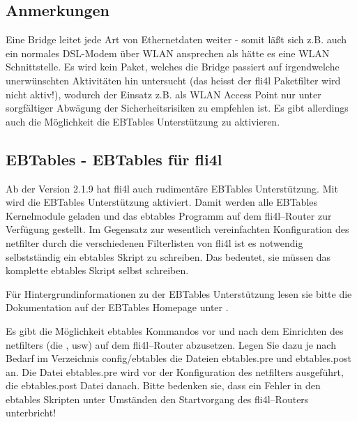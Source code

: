 \subsection{Anmerkungen}

Eine Bridge leitet jede Art von Ethernetdaten weiter - somit läßt sich
z.B.  auch ein normales DSL-Modem über WLAN ansprechen als hätte es
eine WLAN Schnittstelle. Es wird kein Paket, welches die Bridge
passiert auf irgendwelche unerwünschten Aktivitäten hin untersucht
(das heisst der fli4l Paketfilter wird nicht aktiv!), wodurch der
Einsatz z.B. als WLAN Access Point nur unter sorgfältiger Abwägung der
Sicherheitsrisiken zu empfehlen ist. Es gibt allerdings auch die
Möglichkeit die EBTables Unterstützung zu aktivieren.

{
\subsection {EBTables - EBTables für fli4l}
}
Ab der Version 2.1.9 hat fli4l auch rudimentäre EBTables
Unterstützung. Mit  wird die EBTables
Unterstützung aktiviert. Damit werden alle EBTables Kernelmodule
geladen und das ebtables Programm auf dem fli4l--Router zur Verfügung
gestellt. Im Gegensatz zur wesentlich vereinfachten Konfiguration des
netfilter durch die verschiedenen Filterlisten von fli4l ist es
notwendig selbstständig ein ebtables Skript zu schreiben. Das
bedeutet, sie müssen das komplette ebtables Skript selbst schreiben.

Für Hintergrundinformationen zu der EBTables Unterstützung lesen sie
bitte die Dokumentation auf der EBTables Homepage unter
.

Es gibt die Möglichkeit ebtables Kommandos vor und nach dem Einrichten
des netfilters (die ,  usw) auf dem
fli4l--Router abzusetzen. Legen Sie dazu je nach Bedarf im Verzeichnis
config/ebtables die Dateien ebtables.pre und ebtables.post an. Die
Datei ebtables.pre wird vor der Konfiguration des netfilters
ausgeführt, die ebtables.post Datei danach. Bitte bedenken sie, dass
ein Fehler in den ebtables Skripten unter Umständen den Startvorgang
des fli4l--Routers unterbricht!


